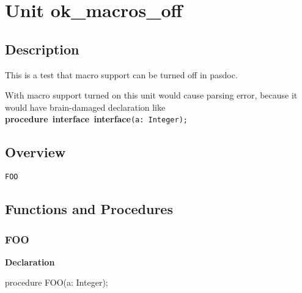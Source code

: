 \documentclass{report}
\begin{document}
\newlength{\tmplength}
\chapter{Unit ok{\_}macros{\_}off}
\section{Description}
This is a test that macro support can be turned off in pasdoc.\hfill\vspace*{1ex}



With macro support turned on this unit would cause parsing error, because it would have brain{-}damaged declaration like \texttt{\\\nopagebreak[3]
}\textbf{procedure}\texttt{~}\textbf{interface}\texttt{~}\textbf{interface}\texttt{(a:~Integer);\\
}
\section{Overview}
\begin{description}
\item[\texttt{FOO}]
\end{description}
\section{Functions and Procedures}
\subsection*{FOO}
\begin{list}{}{
\setlength{\itemindent}{0cm}
\setlength{\listparindent}{0cm}
\setlength{\leftmargin}{\evensidemargin}
\addtolength{\leftmargin}{\tmplength}
\settowidth{\labelsep}{X}
\addtolength{\leftmargin}{\labelsep}
\setlength{\labelwidth}{\tmplength}
}
\begin{flushleft}
\item[\textbf{Declaration}\hfill]
\begin{ttfamily}
procedure FOO(a: Integer);\end{ttfamily}


\end{flushleft}
\end{list}
\end{document}
